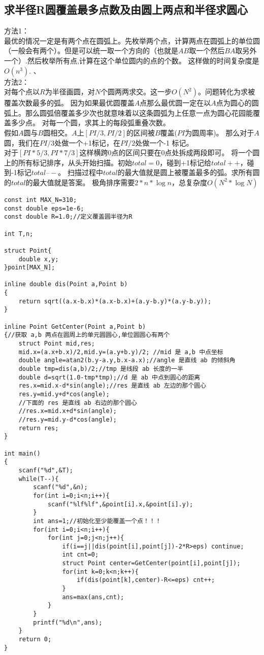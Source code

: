 \subsection{求半径R圆覆盖最多点数及由圆上两点和半径求圆心}
方法1： \\
最优的情况一定是有两个点在圆弧上。先枚举两个点，计算两点在圆弧上的单位圆（一般会有两个）。但是可以统一取一个方向的（也就是$AB$取一个然后$BA$取另外一个）.然后枚举所有点,计算在这个单位圆内的点的个数。 这样做的时间复杂度是$O(n^3)$. 、\\
方法2： \\
对每个点以$R$为半径画圆，对$N$个圆两两求交。这一步$O(N^2)$。问题转化为求被覆盖次数最多的弧。 因为如果最优圆覆盖$A$点那么最优圆一定在以$A$点为圆心的圆弧上。那么圆弧倍覆盖多少次也就意味着以这条圆弧为上任意一点为圆心花园能覆盖多少点。 对每一个圆，求其上的每段弧重叠次数。\\
假如$A$圆与$B$圆相交。$A$上$[PI/3, PI/2]$的区间被$B$覆盖($PI$为圆周率)。 那么对于$A$圆，我们在$PI/3$处做一个+1标记，在$PI/2$处做一个-1 标记。 \\
对于$[PI*5/3, PI*7/3]$这样横跨0点的区间只要在0点处拆成两段即可。 将一个圆上的所有标记排序，从头开始扫描。初始$total=0$，碰到+1标记给$total++$，碰到-1标记$total–-$。 扫描过程中$total$的最大值就是圆上被覆盖最多的弧。求所有圆的$total$的最大值就是答案。 极角排序需要$2*n*\log n$，总复杂度$O(N^2 * \log N)$
\begin{lstlisting}
const int MAX_N=310;
const double eps=1e-6;
const double R=1.0;//定义覆盖圆半径为R

int T,n;

struct Point{
    double x,y;
}point[MAX_N];

inline double dis(Point a,Point b)
{
    return sqrt((a.x-b.x)*(a.x-b.x)+(a.y-b.y)*(a.y-b.y));
}

inline Point GetCenter(Point a,Point b)
{//获取 a,b 两点在圆周上的单元圆圆心,单位圆圆心有两个
    struct Point mid,res;
    mid.x=(a.x+b.x)/2,mid.y=(a.y+b.y)/2; //mid 是 a,b 中点坐标
    double angle=atan2(b.y-a.y,b.x-a.x);//angle 是直线 ab 的倾斜角
    double tmp=dis(a,b)/2;//tmp 是线段 ab 长度的一半
    double d=sqrt(1.0-tmp*tmp);//d 是 ab 中点到圆心的距离
    res.x=mid.x-d*sin(angle);//res 是直线 ab 左边的那个圆心
    res.y=mid.y+d*cos(angle);
    //下面的 res 是直线 ab 右边的那个圆心
    //res.x=mid.x+d*sin(angle);
    //res.y=mid.y-d*cos(angle);
    return res;
}

int main()
{
    scanf("%d",&T);
    while(T--){
        scanf("%d",&n);
        for(int i=0;i<n;i++){
            scanf("%lf%lf",&point[i].x,&point[i].y);
        }
        int ans=1;//初始化至少能覆盖一个点！！！
        for(int i=0;i<n;i++){
            for(int j=0;j<n;j++){
                if(i==j||dis(point[i],point[j])-2*R>eps) continue;
                int cnt=0;
                struct Point center=GetCenter(point[i],point[j]);
                for(int k=0;k<n;k++){
                    if(dis(point[k],center)-R<=eps) cnt++;
                }
                ans=max(ans,cnt);
            }
        }
        printf("%d\n",ans);
    }
    return 0;
}
\end{lstlisting}
